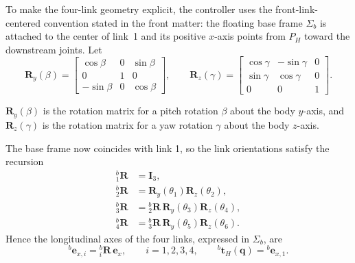 \documentclass[12pt,a4paper]{report}
\newcommand{\newsymbols}[1]{\par\noindent{}#1\par\vspace{0.35em}}
\begin{document}
To make the four-link geometry explicit, the controller uses the front-link-centered convention stated in the front matter: the floating base frame $\Sigma_b$ is attached to the center of link~1 and its positive $x$-axis points from $P_H$ toward the downstream joints. Let
\begin{equation}
\mathbf{R}_{y}(\beta) =
\begin{bmatrix}
\cos \beta & 0 & \sin \beta \\
0 & 1 & 0 \\
-\sin \beta & 0 & \cos \beta
\end{bmatrix},
\qquad
\mathbf{R}_{z}(\gamma) =
\begin{bmatrix}
\cos \gamma & -\sin \gamma & 0 \\
\sin \gamma & \cos \gamma & 0 \\
0 & 0 & 1
\end{bmatrix}.
\end{equation}
\newsymbols{$\mathbf{R}_y(\beta)$ is the rotation matrix for a pitch rotation $\beta$ about the body $y$-axis, and $\mathbf{R}_z(\gamma)$ is the rotation matrix for a yaw rotation $\gamma$ about the body $z$-axis.}

The base frame now coincides with link 1, so the link orientations satisfy the recursion
\begin{equation}
\begin{aligned}
{}_{1}^{b}\mathbf{R} &= \mathbf{I}_3, \\
{}_{2}^{b}\mathbf{R}
&= \mathbf{R}_{y}(\theta_{1}) \mathbf{R}_{z}(\theta_{2}), \\
{}_{3}^{b}\mathbf{R}
&= {}_{2}^{b}\mathbf{R}\,\mathbf{R}_{y}(\theta_{3}) \mathbf{R}_{z}(\theta_{4}), \\
{}_{4}^{b}\mathbf{R}
&= {}_{3}^{b}\mathbf{R}\,\mathbf{R}_{y}(\theta_{5}) \mathbf{R}_{z}(\theta_{6}).
\end{aligned}
\end{equation}
Hence the longitudinal axes of the four links, expressed in $\Sigma_b$, are
\begin{equation}
{}^{b}\mathbf{e}_{x,i} = {}_{i}^{b}\mathbf{R}\,\mathbf{e}_x,
\qquad i = 1,2,3,4,
\qquad
{}^{b}\mathbf{t}_H(\mathbf{q}) = {}^{b}\mathbf{e}_{x,1}.
\end{equation}
\end{document}

